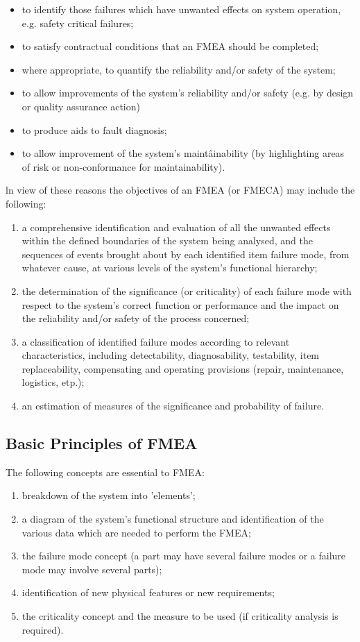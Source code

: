 \documentclass[./dissertation.tex]{subfiles}
\begin{document}
\begin{itemize}
    \item to identify those failures which have unwanted effects on system operation, e.g. safety critical failures;
    \item to satisfy contractual conditions that an FMEA should be completed;
    \item where appropriate, to quantify the reliability and/or safety of the system;
    \item to allow improvements of the system's reliability and/or safety (e.g. by design or quality assurance action)
    \item to produce aids to fault diagnosis;
    \item to allow improvement of the system's maintâinability (by highlighting areas of risk or non-conformance for maintainability).
\end{itemize}

ln view of these reasons the objectives of an FMEA (or FMECA) may include the following: 

\begin{enumerate}
    \item a comprehensive identification and evaluation of all the unwanted effects within the defined boundaries of the system being analysed, and the sequences of events brought about by each identified item failure mode, from whatever cause, at various levels of the system's functional hierarchy;
    \item the determination of the significance (or criticality) of each failure mode with respect to the system's correct function or performance and the impact on the reliability and/or safety of the process concerned;
    \item a classification of identified failure modes according to relevant characteristics, including detectability, diagnosability, testability, item replaceability, compensating and operating provisions (repair, maintenance, logistics, etp.);
    \item an estimation of measures of the significance and probability of failure.
\end{enumerate}


\subsection{Basic Principles of FMEA}
The following concepts are essential to FMEA:

\begin{enumerate}
    \item breakdown of the system into 'elements';
    \item a diagram of the system's functional structure and identification of the various data which are needed to perform the FMEA;
    \item the failure mode concept (a part may have several failure modes or a failure mode may involve several parts);
    \item identification of new physical features or new requirements;
    \item the criticality concept and the measure to be used (if criticality analysis is required).
\end{enumerate}
\end{document}
